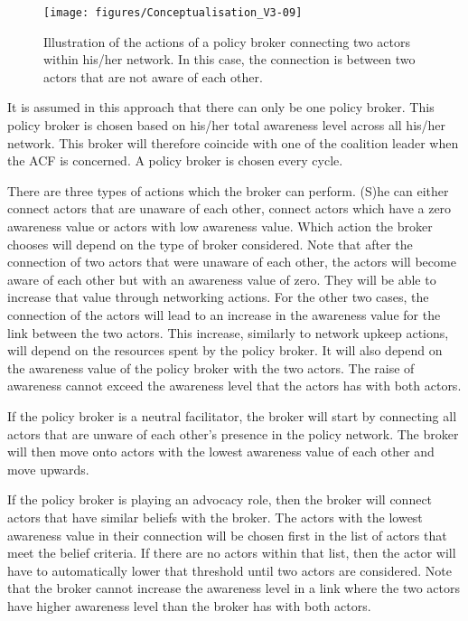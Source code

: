 \begin{figure}
\centering
\texttt{[image: figures/Conceptualisation\_V3-09]}
\caption{Illustration of the actions of a policy broker connecting two actors within his/her network. In this case, the connection is between two actors that are not aware of each other.}
\label{fig:Conceptualisation_V3-09}
\end{figure}

It is assumed in this approach that there can only be one policy broker. This policy broker is chosen based on his/her total awareness level across all his/her network. This broker will therefore coincide with one of the coalition leader when the ACF is concerned. A policy broker is chosen every cycle.

There are three types of actions which the broker can perform. (S)he can either connect actors that are unaware of each other, connect actors which have a zero awareness value or actors with low awareness value. Which action the broker chooses will depend on the type of broker considered. Note that after the connection of two actors that were unaware of each other, the actors will become aware of each other but with an awareness value of zero. They will be able to increase that value through networking actions. For the other two cases, the connection of the actors will lead to an increase in the awareness value for the link between the two actors. This increase, similarly to network upkeep actions, will depend on the resources spent by the policy broker. It will also depend on the awareness value of the policy broker with the two actors. The raise of awareness cannot exceed the awareness level that the actors has with both actors.

If the policy broker is a neutral facilitator, the broker will start by connecting all actors that are unware of each other's presence in the policy network. The broker will then move onto actors with the lowest awareness value of each other and move upwards.

If the policy broker is playing an advocacy role, then the broker will connect actors that have similar beliefs with the broker. The actors with the lowest awareness value in their connection will be chosen first in the list of actors that meet the belief criteria. If there are no actors within that list, then the actor will have to automatically lower that threshold until two actors are considered. Note that the broker cannot increase the awareness level in a link where the two actors have higher awareness level than the broker has with both actors.

